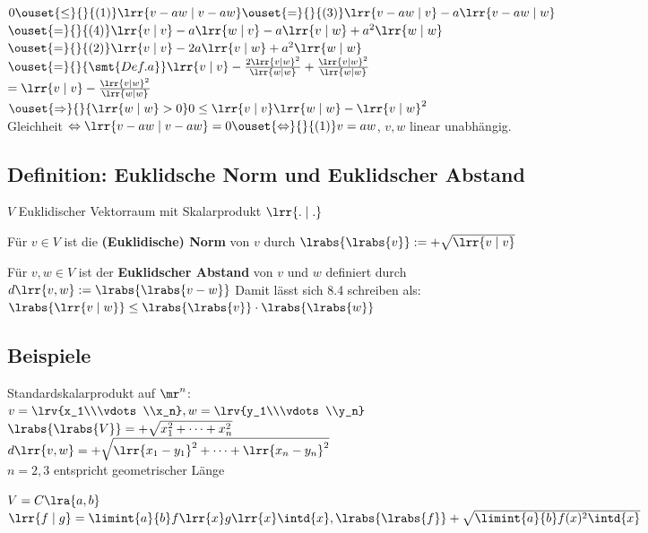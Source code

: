 	$0\ouset{\leq}{}{(1)}\lrr{v-aw\mid v-aw}\ouset{=}{}{(3)}\lrr{v-aw\mid v}-a\lrr{v-aw\mid w}$\\
	$\ouset{=}{}{(4)}\lrr{v\mid v}-a\lrr{w\mid v}-a\lrr{v\mid w}+a^2\lrr{w\mid w}$\\
	$\ouset{=}{}{(2)}\lrr{v\mid v}-2a\lrr{v\mid w}+a^2\lrr{w\mid w}$\\
	$\ouset{=}{}{\smt{Def. a}}\lrr{v\mid v}-\frac{2\lrr{v\mid w}^2}{\lrr{w\mid w}}+\frac{\lrr{v\mid w}^2}{\lrr{w\mid w}}$\\
	$=\lrr{v\mid v}-\frac{\lrr{v\mid w}^2}{\lrr{w\mid w}}$\\
	$\ouset{\Rightarrow}{}{\lrr{w\mid w}>0} 0\leq\lrr{v\mid v}\lrr{w\mid w}-\lrr{v\mid w}^2$\\
	Gleichheit $\Leftrightarrow\lrr{v-aw\mid v-aw}=0\ouset{\Leftrightarrow}{}{(1)}v=aw$, $v,w$ linear unabhängig.

\subsection{Definition: Euklidsche Norm und Euklidscher Abstand}
	$V$ Euklidischer Vektorraum mit Skalarprodukt $\lrr{.\mid .}$
		\item Für $v\in V$ ist die \textbf{(Euklidische) Norm} von $v$ durch $\lrabs{\lrabs{v}}:=+\sqrt{\lrr{v\mid v}}$
		\item Für $v,w\in V$ ist der \textbf{Euklidscher Abstand} von $v$ und $w$ definiert durch\\
			$d\lrr{v,w}:=\lrabs{\lrabs{v-w}}$
	\subExEnd
	Damit lässt sich 8.4 schreiben als: $\lrabs{\lrr{v\mid w}}\leq\lrabs{\lrabs{v}}\cdot\lrabs{\lrabs{w}}$

\subsection{Beispiele}
		\item Standardskalarprodukt auf $\mr^n$:\\
			$v=\lrv{x_1\\\vdots\\x_n}, w=\lrv{y_1\\\vdots\\y_n}$\\
			$\lrabs{\lrabs{V}}=+\sqrt{x_1^2+\dots+x_n^2}$\\
			$d\lrr{v,w}=+\sqrt{\lrr{x_1-y_1}^2+\dots+\lrr{x_n-y_n}^2}$\\
			$n=2,3$ entspricht geometrischer Länge
		\item $V=C\lra{a,b}$\\
			$\lrr{f\mid g}=\limint{a}{b}f\lrr{x}g\lrr{x}\intd{x}, \lrabs{\lrabs{f}}+\sqrt{\limint{a}{b}f(x)^2\intd{x}}$
	\subExEnd

